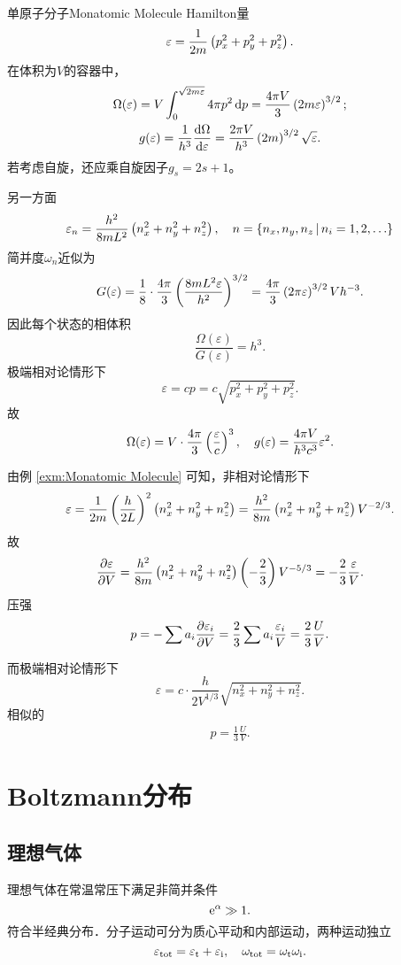 \begin{example}{单原子分子}{Monatomic Molecule}
	Hamilton量
	\[
		\varepsilon=\frac1{2m}\left(p_x^2+p_y^2+p_z^2\right).
	\]
	在体积为$V$的容器中，
	\begin{gather}\notag
		\Omega(\varepsilon)=V\int_0^{\sqrt{2m\varepsilon}}4\pi p^2\mathop{}\!\mathrm{d} p=\frac{4\pi V}3\left(2m\varepsilon\right)^{3/2};\\
		g(\varepsilon)=\frac1{h^3}\frac{\mathrm{d}^{\;\!\!}\Omega}{\mathrm{d} \varepsilon^{\;\!\!}}=\frac{2\pi V}{h^3}\left(2m\right)^{3/2}\sqrt\varepsilon.
	\end{gather}
	若考虑自旋，还应乘自旋因子$g_s=2s+1$。

	另一方面
	\[
		\varepsilon_n=\frac{h^2}{8mL^2}\left(n_x^2+n_y^2+n_z^2\right),\quad n=\left\{n_x,n_y,n_z\,\middle\vert\,n_i=1,2,\ldots\right\}
	\]
	简并度$\omega_n$近似为
	\[
		G(\varepsilon)=\frac18\cdot\frac{4\pi}3\left(\frac{8mL^2\varepsilon}{h^2}\right)^{3/2}=\frac{4\pi}{3}\left(2\pi\varepsilon\right)^{3/2}Vh^{-3}.
	\]
	因此每个状态的相体积
	\[
		\frac{\Omega(\varepsilon)}{G(\varepsilon)}=h^3.
	\]
	\tcblower
	极端相对论情形下
	\[
		\varepsilon=cp=c\sqrt{p_x^2+p_y^2+p_z^2}.
	\]
	故
	\begin{align}
		\Omega(\varepsilon)=V\cdot\frac{4\pi}3\left(\frac\varepsilon{c}\right)^3,\quad g(\varepsilon)=\frac{4\pi V}{h^3c^3}\varepsilon^2.
	\end{align}
\end{example}
由例 \ref{exm:Monatomic Molecule} 可知，非相对论情形下
\[
	\varepsilon=\frac1{2m}\left(\frac h{2L}\right)^2\left(n_x^2+n_y^2+n_z^2\right)=\frac{h^2}{8m}\left(n_x^2+n_y^2+n_z^2\right)V^{-2/3}.
\]
故
\[
	\frac{\partial^{\;\!\!}\varepsilon}{\partial V^{\;\!\!}}=\frac{h^2}{8m}\left(n_x^2+n_y^2+n_z^2\right)\left(-\frac23\right)V^{-5/3}=-\frac23\frac\varepsilon V.
\]
压强
\begin{align}
	p=-\sum a_i\frac{\partial^{\;\!\!}\varepsilon_i}{\partial V^{\;\!\!}}=\frac23\sum a_i\frac{\varepsilon_i}V=\frac23\frac UV.
\end{align}

而极端相对论情形下
\[
	\varepsilon=c\cdot\frac h{2V^{1/3}}\sqrt{n_x^2+n_y^2+n_z^2}.
\]
相似的
\begin{align}
	p=\frac13\frac UV.
\end{align}
\clearpage
\section{Boltzmann分布}
\subsection{理想气体}
理想气体在常温常压下满足非简并条件
\[
	\mathop{}\!\mathrm{e}^\alpha\gg 1.
\]
符合半经典分布．分子运动可分为质心平动和内部运动，两种运动独立
\[
	\varepsilon_\mathrm{tot}=\varepsilon_\mathrm t+\varepsilon_{\mathrm{i}},\quad\omega_\mathrm{tot}=\omega_\mathrm t\omega_{\mathrm{i}}.
\]
